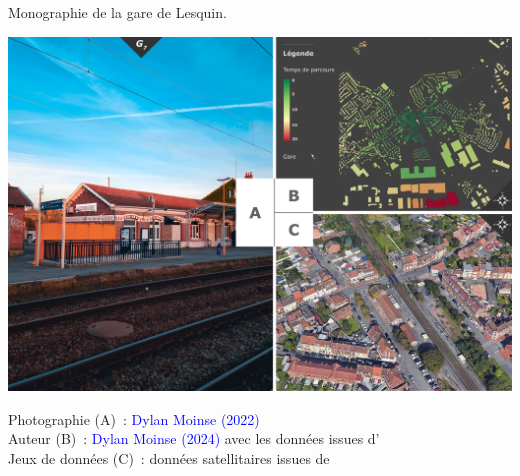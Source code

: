 \begin{refsegment}
        \begin{carte}[h!]\vspace*{4pt}
        \caption{Monographie de la gare de Lesquin.}
        \label{fig-chap3:monographie-lesquin}
        \centerline{\includegraphics[height=.35\pageheight]{src/Figures/Chap-3/FR_Gare_Lesquin.jpg}}
        \vspace{5pt}
        \begin{flushright}\scriptsize{
        Photographie (A)~: \textcolor{blue}{Dylan Moinse (2022)}
        \\
        Auteur (B)~: \textcolor{blue}{Dylan Moinse (2024)} avec les données issues d'\textcolor{blue}{\textcite{openstreetmap_openstreetmap_2023}}
        \\
      Jeux de données (C)~: données satellitaires issues de \textcolor{blue}{\textcite{google_earth_google_2023}}
      }\end{flushright}
      \end{carte}


\end{refsegment}
